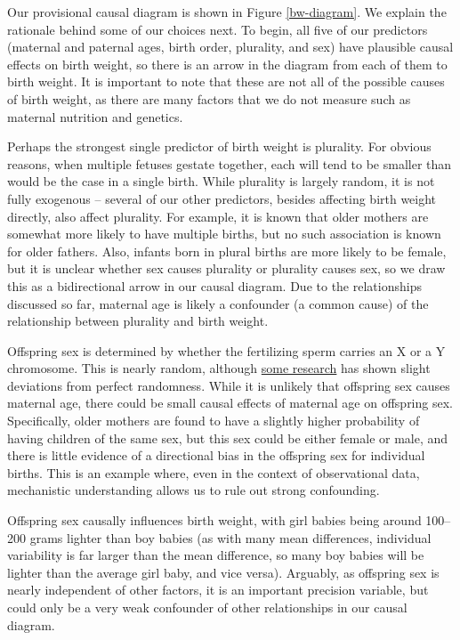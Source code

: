 Our provisional causal diagram is shown in Figure \ref{bw-diagram}.  We explain the rationale behind some of our choices next.  To begin, all five of our predictors (maternal and paternal ages, birth order, plurality, and sex) have plausible causal effects on birth weight, so there is an arrow in the diagram from each of them to birth weight.  It is important to note that these are not all of the possible causes of birth weight, as there are many factors that we do not measure such as maternal nutrition and genetics.

Perhaps the strongest single predictor of birth weight is plurality.  For obvious reasons, when multiple fetuses gestate together, each will tend to be smaller than would be the case in a single birth.  While plurality is largely random, it is not fully exogenous -- several of our other predictors, besides affecting birth weight directly, also affect plurality.  For example, it is known that older mothers are somewhat more likely to have multiple births, but no such association is known for older fathers. Also, infants born in plural births are more likely to be female, but it is unclear whether sex causes plurality or plurality causes sex, so we draw this as a bidirectional arrow in our causal diagram.  Due to the relationships discussed so far, maternal age is likely a confounder (a common cause) of the relationship between plurality and birth weight.

Offspring sex is determined by whether the fertilizing sperm carries an X or a Y chromosome.  This is nearly random, although \href{https://www.science.org/doi/10.1126/sciadv.adu7402}{some research} has shown slight deviations from perfect randomness.  While it is unlikely that offspring sex causes maternal age, there could be small causal effects of maternal age on offspring sex.  Specifically, older mothers are found to have a slightly higher probability of having children of the same sex, but this sex could be either female or male, and there is little evidence of a directional bias in the offspring sex for individual births.  This is an example where, even in the context of observational data, mechanistic understanding allows us to rule out strong confounding.

Offspring sex causally influences birth weight, with girl babies being around 100--200 grams lighter than boy babies (as with many mean differences, individual variability is far larger than the mean difference, so many boy babies will be lighter than the average girl baby, and vice versa).  Arguably, as offspring sex is nearly independent of other factors, it is an important precision variable, but could only be a very weak confounder of other relationships in our causal diagram.

